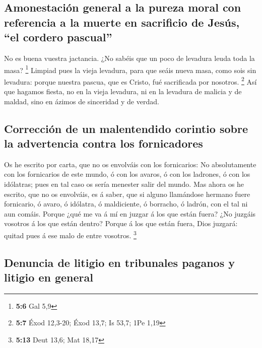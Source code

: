 \hypertarget{amonestaciuxf3n-general-a-la-pureza-moral-con-referencia-a-la-muerte-en-sacrificio-de-jesuxfas-el-cordero-pascual}{%
\subsection{Amonestación general a la pureza moral con referencia a la
muerte en sacrificio de Jesús, ``el cordero
pascual''}\label{amonestaciuxf3n-general-a-la-pureza-moral-con-referencia-a-la-muerte-en-sacrificio-de-jesuxfas-el-cordero-pascual}}

 No es buena vuestra jactancia. ¿No sabéis que un poco de
levadura leuda toda la masa? \footnote{\textbf{5:6} Gal 5,9}
 Limpiad pues la vieja levadura, para que seáis nueva
masa, como sois sin levadura: porque nuestra pascua, que es Cristo, fué
sacrificada por nosotros. \footnote{\textbf{5:7} Éxod 12,3-20; Éxod
  13,7; Is 53,7; 1Pe 1,19}  Así que hagamos fiesta, no en
la vieja levadura, ni en la levadura de malicia y de maldad, sino en
ázimos de sinceridad y de verdad.

\hypertarget{correcciuxf3n-de-un-malentendido-corintio-sobre-la-advertencia-contra-los-fornicadores}{%
\subsection{Corrección de un malentendido corintio sobre la advertencia
contra los
fornicadores}\label{correcciuxf3n-de-un-malentendido-corintio-sobre-la-advertencia-contra-los-fornicadores}}

 Os he escrito por carta, que no os envolváis con los
fornicarios:  No absolutamente con los fornicarios de
este mundo, ó con los avaros, ó con los ladrones, ó con los idólatras;
pues en tal caso os sería menester salir del mundo.  Mas
ahora os he escrito, que no os envolváis, es á saber, que si alguno
llamándose hermano fuere fornicario, ó avaro, ó idólatra, ó maldiciente,
ó borracho, ó ladrón, con el tal ni aun comáis.  Porque
¿qué me va á mí en juzgar á los que están fuera? ¿No juzgáis vosotros á
los que están dentro?  Porque á los que están fuera, Dios
juzgará: quitad pues á ese malo de entre vosotros. \footnote{\textbf{5:13}
  Deut 13,6; Mat 18,17}

\hypertarget{denuncia-de-litigio-en-tribunales-paganos-y-litigio-en-general}{%
\subsection{Denuncia de litigio en tribunales paganos y litigio en
general}\label{denuncia-de-litigio-en-tribunales-paganos-y-litigio-en-general}}

